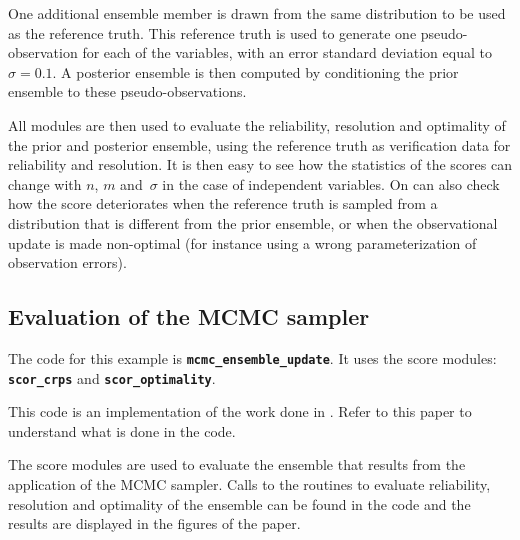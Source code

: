 \documentclass[11pt]{article}
\begin{document}
One additional ensemble member is drawn from the same distribution
to be used as the reference truth.
This reference truth is used to generate one pseudo-observation
for each of the variables, with an error standard deviation equal to~$\sigma=0.1$.
A posterior ensemble is then computed by conditioning the prior ensemble
to these pseudo-observations.

All modules are then used to evaluate the reliability, resolution
and optimality of the prior and posterior ensemble,
using the reference truth as verification data for reliability and resolution.
It is then easy to see how the statistics of the scores
can change with $n$, $m$ and~$\sigma$ in the case of independent variables.
On can also check how the score deteriorates
when the reference truth is sampled from a distribution
that is different from the prior ensemble, or
when the observational update is made non-optimal
(for instance using a wrong parameterization of observation errors).

\subsection{Evaluation of the MCMC sampler}

The code for this example is {\tt\bf mcmc\_ensemble\_update}.
It uses the score modules: {\tt\bf scor\_crps} and {\tt\bf scor\_optimality}.

This code is an implementation of the work done in \citep{BRAN19}.
Refer to this paper to understand what is done in the code.

The score modules are used to evaluate the ensemble
that results from the application of the MCMC sampler.
Calls to the routines to evaluate reliability, resolution and optimality
of the ensemble can be found in the code and the results
are displayed in the figures of the paper.

\clearpage
\end{document}
